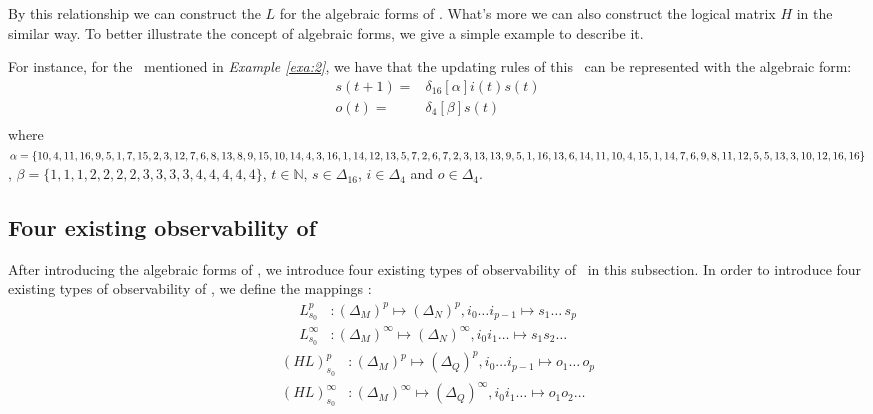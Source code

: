 By this relationship we can construct the $L$ for the algebraic forms of \BCNs. What's more we can also construct the logical matrix $H$ in the similar way. To better illustrate the concept of algebraic forms, we give a simple example to describe it.
\begin{example}
For instance, for the \BCN\ mentioned in {\em Example \ref{exa:2}}, we have that the updating rules of this \BCN\ can be represented with the algebraic form:
\begin{equation}
\begin{split}
s(t+1) =&\delta_{16}[\alpha]i(t)s(t)\\
o(t) =&\delta_4[\beta]s(t)\\
\end{split}
\label{equ:4}
\end{equation}
where $\alpha=\{10,4,11,16,9,5,1, 7,15,2,3,12,7,6,8,13,8,9,\\15,10,14,4,3,16,1,14,12,13,5,7,2,6,7,2,3,13,13,9,5,1,\\16,13 ,6,14,11,10,4,15,1,14 ,7,6,9 ,8,11,12,5,5,13,3,10,\\12,16,16\}$, $\beta=\{1,1,1,2,2,2,2,3,3,3,3,4,4,4,4,4\}$, $t\in \mathbb{N}$, $s\in \Delta_{16}$, $i\in \Delta_4$ and $o\in \Delta_4$.
\end{example}   
\subsection{Four existing observability of \BCNs}
After introducing the algebraic forms of \BCNs, we introduce four existing types of observability of \BCNs\ in this subsection. In order to introduce four existing types of observability of \BCNs, we define the mappings \cite{Zhang2016Observability}:
\begin{equation}
\begin{split}
L^p_{s_0} &: (\Delta_M)^p\mapsto(\Delta_N)^p, i_0\ldots i_{p-1} \mapsto s_1 \ldots\, s_p\\
L^{\infty}_{s_0} &: (\Delta_M)^{\infty}\mapsto(\Delta_N)^{\infty}, i_0 i_1 \ldots  \mapsto s_1 s_2 \ldots
\end{split}
\label{equ:5}
\end{equation}
\begin{equation}
\begin{split}
(HL)^p_{s_0} &: (\Delta_M)^p\mapsto(\Delta_Q)^p, i_0\ldots i_{p-1} \mapsto o_1\ldots\, o_p\\
(HL)^{\infty}_{s_0} &: (\Delta_M)^{\infty}\mapsto(\Delta_Q)^{\infty}, i_0 i_1 \ldots  \mapsto o_1 o_2\ldots
\end{split}
\label{equ:6}
\end{equation}

